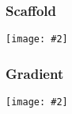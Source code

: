 \documentclass{beamer}
\newcommand{\plotslide}[2]{
  \begin{frame}
    \frametitle{#1}
    \texttt{[image: \#2]}
  \end{frame}
}
\begin{document}
\plotslide{Scaffold}{ScaffoldVsMAPKppMI.pdf}

\plotslide{Gradient}{GradientVsMI.pdf}
\end{document}
